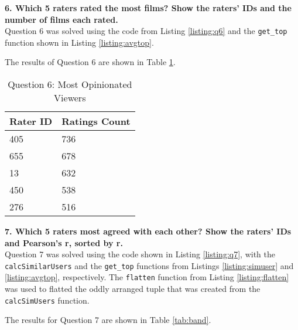 \textbf{6. Which 5 raters rated the most films? Show the raters' IDs and the number of films each rated.}\\

Question 6 was solved using the code from Listing \ref{listing:q6} and the {\tt get\_top} function shown in Listing \ref{listing:avgtop}.

 

The results of Question 6 are shown in Table \ref{tab:opinion}.

\clearpage

\begin{table}[h!]
\centering
\begin{tabular}{| l | l |}
\hline
Rater ID & Ratings Count \\
\hline
405 & 736 \\
655 & 678 \\
13 & 632 \\
450 & 538 \\
276 & 516 \\
\hline
\end{tabular}
\caption{Question 6: Most Opinionated Viewers}
\label{tab:opinion}
\end{table}

\textbf{7. Which 5 raters most agreed with each other? Show the raters' IDs and Pearson's r, sorted by r.}\\

Question 7 was solved using the code shown in Listing \ref{listing:q7}, with the {\tt calcSimilarUsers} and the {\tt get\_top} functions from Listings \ref{listing:simuser} and \ref{listing:avgtop}, respectively. The {\tt flatten} function from Listing \ref{listing:flatten} was used to flatted the oddly arranged tuple that was created from the {\tt calcSimUsers} function.







The results for Question 7 are shown in Table \ref{tab:band}.

